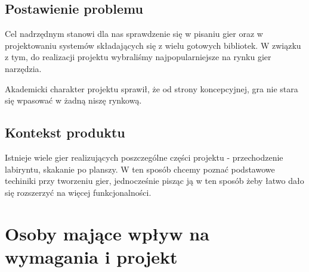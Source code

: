 \documentclass[12pt,a4paper,twoside]{article}
\begin{document}
\subsection{Postawienie problemu}
Cel nadrzędnym stanowi dla nas sprawdzenie się w pisaniu gier oraz w projektowaniu systemów składających się z wielu gotowych bibliotek.
W związku z tym, do realizacji projektu wybraliśmy najpopularniejsze na rynku gier narzędzia.


Akademicki charakter projektu sprawił, że od strony koncepcyjnej, gra nie stara się wpasować w żadną niszę rynkową.

\subsection{Kontekst produktu}
Istnieje wiele gier realizujących poszczególne części projektu - przechodzenie labiryntu, skakanie po planszy. W ten sposób chcemy poznać podstawowe techiniki przy tworzeniu gier, jednocześnie pisząc ją w ten sposób żeby łatwo dało się rozszerzyć na więcej funkcjonalności.




\section{Osoby mające wpływ na wymagania i projekt}

\end{document}
